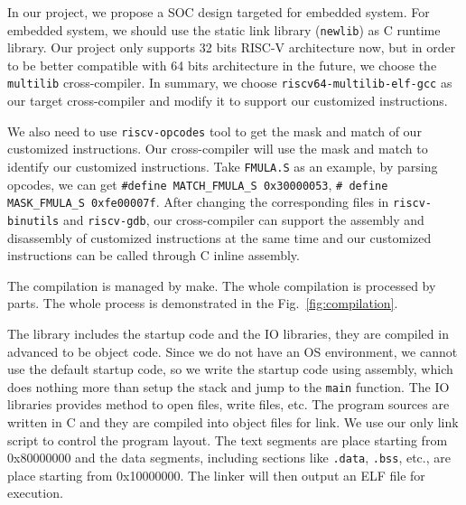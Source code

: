 In our project, we propose a SOC design targeted for embedded system. For embedded system, we should use the static link library (\texttt{newlib}) as C runtime library. Our project only supports 32 bits RISC-V architecture now, but in order to be better compatible with 64 bits architecture in the future, we choose the \texttt{multilib} cross-compiler.  In summary, we choose \texttt{riscv64-multilib-elf-gcc} as our target cross-compiler and modify it to support our customized instructions. 

We also need to use \texttt{riscv-opcodes} tool to get the mask and match of our customized instructions. Our cross-compiler will use the mask and match to identify our customized instructions. Take \texttt{FMULA.S} as an example, by parsing opcodes, we can get \texttt{\#define MATCH\_FMULA\_S 0x30000053}, \texttt{\# define MASK\_FMULA\_S 0xfe00007f}. After changing the corresponding files in \texttt{riscv-binutils} and \texttt{riscv-gdb}, our cross-compiler can support the assembly and disassembly of customized instructions at the same time and our customized instructions can be called through C inline assembly.

The compilation is managed by make. The whole compilation is processed by parts. The whole process is demonstrated in the Fig.~\ref{fig:compilation}.


The library includes the startup code and the IO libraries, they are compiled in advanced to be object code. Since we do not have an OS environment, we cannot use the default startup code, so we write the startup code using assembly, which does nothing more than setup the stack and jump to the \texttt{main} function. The IO libraries provides method to open files, write files, etc.  The program sources are written in C and they are compiled into object files for link. We use our only link script to control the program layout. The text segments are place starting from 0x80000000 and the data segments, including sections like \texttt{.data}, \texttt{.bss}, etc., are place starting from 0x10000000. The linker will then output an ELF file for execution.

